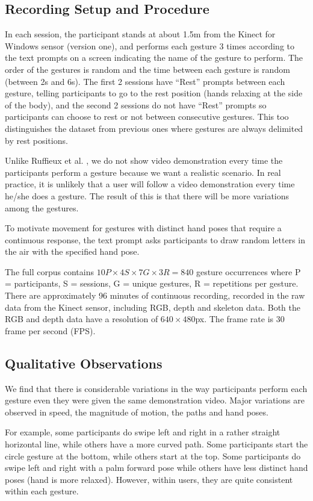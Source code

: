 \documentclass[conference]{IEEEtran}
\begin{document}
\subsection{Recording Setup and Procedure}
In each session, the participant stands at about 1.5m from the Kinect
for Windows sensor (version one), and performs each gesture 3 times
according to the text prompts on a screen indicating the name of the gesture to
perform.
The order of the gestures is random and the time between each gesture is random
(between 2s and 6s). The first 2 sessions have ``Rest'' prompts between each
gesture, telling participants to go to the rest position (hands relaxing at the
side of the body), and the second 2 sessions do not have ``Rest'' prompts so
participants can choose to rest or not between consecutive gestures. This too
distinguishes the dataset from previous ones \cite{Ruffieux2013, guyon13} where
gestures are always delimited by rest positions.

Unlike Ruffieux et al. \cite{Ruffieux2013}, we do not show video demonstration
every time the participants perform a gesture because we want a
realistic scenario. In real practice, it is unlikely that a user will follow a
video demonstration every time he/she does a gesture. The result of this is that
there will be more variations among the gestures.

To motivate movement for gestures with distinct hand poses that
require a continuous response, the text prompt asks participants to draw
random letters in the air with the specified hand pose. 

The full corpus contains $
10P \times 4S \times 7G \times 3R = 840$ gesture occurrences
where P = participants, S = sessions, G = unique gestures, R = repetitions per
gesture. There are approximately 96 minutes of continuous recording,
recorded in the raw data from the Kinect sensor, including RGB, depth and
skeleton data. Both the RGB and depth data have a resolution of
$640\times480$px. The frame rate is 30 frame per second (FPS).

\subsection{Qualitative Observations}
We find that there is considerable variations in the way participants perform
each gesture even they were given the same demonstration video. Major variations
are observed in speed, the magnitude of motion, the paths and hand poses.

For example, some participants do swipe left and right in a rather straight
horizontal line, while others have a more curved path. Some participants start
the circle gesture at the bottom, while others start at the top. Some
participants do swipe left and right with a palm forward pose while others have
less distinct hand poses (hand is more relaxed). However, within users, they are
quite consistent within each gesture. 
\end{document}
